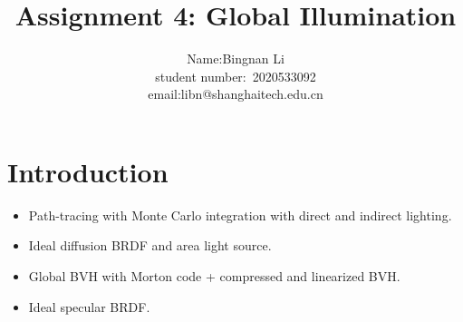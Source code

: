 \documentclass[acmtog]{acmart}
\title{Assignment 4: {Global Illumination}}
\author{Name:\quad Bingnan Li \\ student number:\ 2020533092
\\email:\quad libn@shanghaitech.edu.cn}
\begin{document}
\maketitle

\vspace*{2 ex}

\section{Introduction}
\begin{itemize}
	\item Path-tracing with Monte Carlo integration with direct and indirect lighting.
	\item Ideal diffusion BRDF and area light source.
	\item Global BVH with Morton code + compressed and linearized BVH.
	\item Ideal specular BRDF.
\end{itemize}
\end{document}
